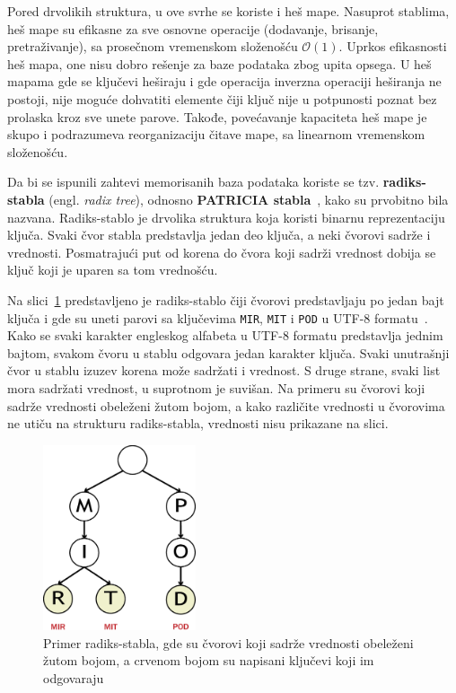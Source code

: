 \documentclass[12pt,oneside]{memoir}
\begin{document}
Pored drvolikih struktura, u ove svrhe se koriste i heš mape. Nasuprot
stablima, heš mape su efikasne za sve osnovne operacije (dodavanje, brisanje, pretraživanje),
sa prosečnom vremenskom složenošću $ \mathcal{O}(1) $. Uprkos efikasnosti heš mapa, one nisu
dobro rešenje za baze podataka zbog upita opsega. U heš mapama gde se ključevi heširaju
i gde operacija inverzna operaciji heširanja ne postoji, nije moguće dohvatiti
elemente čiji ključ nije u potpunosti poznat bez prolaska kroz sve unete parove.
Takođe, povećavanje kapaciteta heš mape je skupo i podrazumeva reorganizaciju
čitave mape, sa linearnom vremenskom složenošću.

Da bi se ispunili zahtevi memorisanih baza podataka koriste se tzv.
\textbf{radiks-stabla} (engl. \emph{radix tree}), odnosno
\textbf{PATRICIA stabla}~\cite{patricia}, kako su prvobitno bila nazvana.
Radiks-stablo je drvolika struktura koja koristi binarnu reprezentaciju ključa.
Svaki čvor stabla predstavlja jedan deo ključa, a neki čvorovi
sadrže i vrednosti. Posmatrajući put od korena do čvora koji
sadrži vrednost dobija se ključ koji je uparen sa tom
vrednošću.

Na slici~\ref{fig:radix} predstavljeno je radiks-stablo
čiji čvorovi predstavljaju po jedan bajt ključa i gde su uneti parovi sa
ključevima \texttt{MIR}, \texttt{MIT} i \texttt{POD} u
UTF-8 formatu~\cite{unicode}.
Kako se svaki karakter engleskog alfabeta u UTF-8 formatu predstavlja
jednim bajtom, svakom čvoru u stablu odgovara jedan karakter
ključa. Svaki unutrašnji čvor u stablu izuzev korena može sadržati i vrednost.
S druge strane, svaki list mora sadržati vrednost, u suprotnom je suvišan.
Na primeru su čvorovi koji sadrže vrednosti obeleženi žutom bojom,
a kako različite vrednosti u čvorovima ne utiču na strukturu
radiks-stabla, vrednosti nisu prikazane na slici.

\begin{figure}[!h]
  \centering
  \includegraphics[width=0.40\textwidth]{radix_tree.eps}
  \caption{Primer radiks-stabla, gde su čvorovi koji sadrže vrednosti
    obeleženi žutom bojom, a crvenom bojom su napisani ključevi koji im
    odgovaraju}
  \label{fig:radix}
\end{figure}
\end{document}
